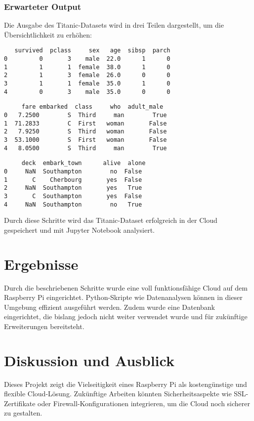 \documentclass[a4paper,12pt]{article}
\begin{document}
\subsubsection{Erwarteter Output}
Die Ausgabe des Titanic-Datasets wird in drei Teilen dargestellt, um die Übersichtlichkeit zu erhöhen:

\begin{lstlisting}
   survived  pclass     sex   age  sibsp  parch  
0         0       3    male  22.0      1      0  
1         1       1  female  38.0      1      0  
2         1       3  female  26.0      0      0  
3         1       1  female  35.0      1      0  
4         0       3    male  35.0      0      0  
\end{lstlisting}

\begin{lstlisting}
     fare embarked  class     who  adult_male  
0   7.2500        S  Third     man        True  
1  71.2833        C  First   woman       False  
2   7.9250        S  Third   woman       False  
3  53.1000        S  First   woman       False  
4   8.0500        S  Third     man        True  
\end{lstlisting}

\begin{lstlisting}
     deck  embark_town      alive  alone  
0     NaN  Southampton        no  False  
1       C    Cherbourg       yes  False  
2     NaN  Southampton       yes   True  
3       C  Southampton       yes  False  
4     NaN  Southampton        no   True  
\end{lstlisting}

\noindent
Durch diese Schritte wird das Titanic-Dataset erfolgreich in der Cloud gespeichert und mit Jupyter Notebook analysiert.


\section{Ergebnisse}
Durch die beschriebenen Schritte wurde eine voll funktionsfähige Cloud auf dem Raspberry Pi eingerichtet. Python-Skripte wie Datenanalysen können in dieser Umgebung effizient ausgeführt werden. Zudem wurde eine Datenbank eingerichtet, die bislang jedoch nicht weiter verwendet wurde und für zukünftige Erweiterungen bereitsteht.

\section{Diskussion und Ausblick}
Dieses Projekt zeigt die Vielseitigkeit eines Raspberry Pi als kostengünstige und flexible Cloud-Lösung. Zukünftige Arbeiten könnten Sicherheitsaspekte wie SSL-Zertifikate oder Firewall-Konfigurationen integrieren, um die Cloud noch sicherer zu gestalten.
\end{document}
